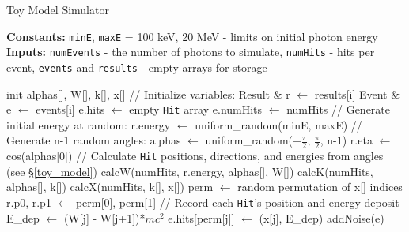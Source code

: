 \begin{algorithm}
\caption{Toy Model Simulator}\label{recon}
\hspace{\algorithmicindent} \textbf{Constants:} \texttt{minE}, \texttt{maxE} = 100 keV, 20 MeV - limits on initial photon energy
\hspace{\algorithmicindent} \textbf{Inputs:} \texttt{numEvents} - the number of photons to simulate, \texttt{numHits} - hits per event, \texttt{events} and \texttt{results} - empty arrays for storage
\begin{algorithmic}[1]
    \State init alphas[], W[], k[], x[] 
    \State {}
        \State // Initialize variables:
        \State Result \& r $\leftarrow$ results[i] 
        \State Event \& e $\leftarrow$ events[i]
        \State e.hits $\leftarrow$ empty \texttt{Hit} array 
        \State e.numHits $\leftarrow$ numHits
        \State
        \State // Generate initial energy at random:
        \State r.energy $\leftarrow$ uniform\_random(minE, maxE)  \label{ln:initE}
        \State
        \State // Generate n-1 random angles:
        \State alphas $\leftarrow$ uniform\_random($-\frac{\pi}{2}$, $\frac{\pi}{2}$, n-1)  \label{ln:alphas}
        \State r.eta $\leftarrow$ cos(alphas[0]) 
        \State 
        \State // Calculate \texttt{Hit} positions, directions, and energies from angles (see \S\ref{toy_model})
        \State calcW(numHits, r.energy, alphas[], W[])  \label{ln:calcW}
        \State calcK(numHits, alphas[], k[])  \label{ln:calcK}
        \State calcX(numHits, k[], x[])  \label{ln:calcX}
        \State
        \State perm $\leftarrow$ random permutation of x[] indices  \label{ln:shuffle}
        \State r.p0, r.p1 $\leftarrow$ perm[0], perm[1] 
        \State 
        \State // Record each \texttt{Hit}'s position and energy deposit
            \State E\_dep $\leftarrow$ (W[j] - W[j+1])*$mc^2$ 
            \State e.hits[perm[j]] $\leftarrow$ (x[j], E\_dep) 
        \EndFor
        \State
        \State addNoise(e)  \label{ln:noise}
        \State
    \EndFor
\EndFunction
\end{algorithmic}
\end{algorithm}

